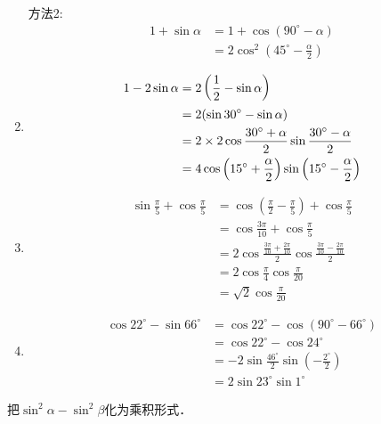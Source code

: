 \begin{solution}
\begin{enumerate}
方法2: 
\[\begin{split}
    1+\sin\alpha &=1+\cos(90^{\circ}-\alpha)\\
    &=2\cos^2\left(45^{\circ}-\frac{\alpha}{2}\right)
\end{split}\]
\item \[\begin{split}
    1-2\sin\alpha &=2\left(\dfrac{1}{2}-\sin\alpha\right)\\
    &=2(\sin30^{\circ}-\sin\alpha)\\
    &=2\times 2\cos\dfrac{30^{\circ}+\alpha}{2}\sin\dfrac{30^{\circ}-\alpha}{2}\\
    &=4\cos\left(15^{\circ}+\dfrac{\alpha}{2}\right)\sin \left(15^{\circ}-\dfrac{\alpha}{2}\right)
\end{split}\]    
\item \[\begin{split}
    \sin\frac{\pi}{5}+\cos\frac{\pi}{5}&= \cos\left(\frac{\pi}{2}-\frac{\pi}{5}\right)+\cos\frac{\pi}{5}\\
    &=\cos\frac{3\pi}{10}+\cos\frac{\pi}{5}\\
    &=2\cos\frac{\frac{3\pi}{10}+\frac{2\pi}{10}}{2}\cos\frac{\frac{3\pi}{10}-\frac{2\pi}{10}}{2} \\
    &=2\cos\frac{\pi}{4}\cos\frac{\pi}{20}\\
    &=\sqrt{2}\cos\frac{\pi}{20}
\end{split}\]    
\item \[\begin{split}
    \cos22^{\circ}-\sin 66^{\circ}&=\cos22^{\circ}-\cos(90^{\circ}-66^{\circ}) \\
    &=\cos22^{\circ}-\cos 24^{\circ}\\
    &=-2\sin\frac{46^{\circ}}{2}\sin\left(-\frac{2^{\circ}}{2}\right)\\
    &=2\sin 23^{\circ}\sin 1^{\circ}
\end{split}\]    
\end{enumerate}
\end{solution}


\begin{example}
    把$\sin^2\alpha-\sin^2\beta$化为乘积形式．
\end{example}

